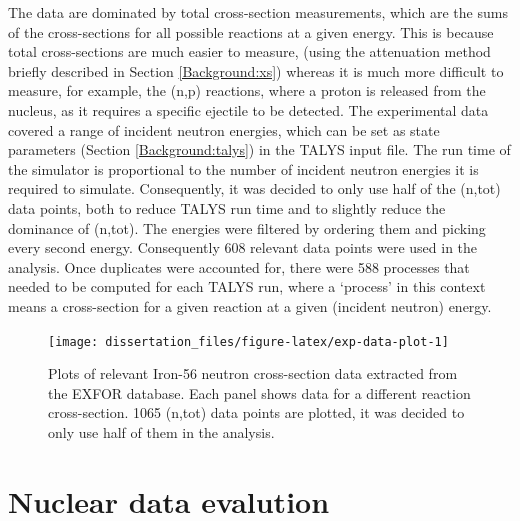 \documentclass[
  12pt,
  a4paper,
  twoside]{book}
\begin{document}
The data are dominated by total cross-section measurements, which are the sums of the cross-sections for all possible reactions at a given energy. This is because total cross-sections are much easier to measure, (using the attenuation method briefly described in Section \ref{Background:xs}) whereas it is much more difficult to measure, for example, the (n,p) reactions, where a proton is released from the nucleus, as it requires a specific ejectile to be detected. The experimental data covered a range of incident neutron energies, which can be set as state parameters (Section \ref{Background:talys}) in the TALYS input file. The run time of the simulator is proportional to the number of incident neutron energies it is required to simulate. Consequently, it was decided to only use half of the (n,tot) data points, both to reduce TALYS run time and to slightly reduce the dominance of (n,tot). The energies were filtered by ordering them and picking every second energy. Consequently 608 relevant data points were used in the analysis. Once duplicates were accounted for, there were 588 processes that needed to be computed for each TALYS run, where a `process' in this context means a cross-section for a given reaction at a given (incident neutron) energy.

\begin{figure}[H]

{\centering \texttt{[image: dissertation\_files/figure-latex/exp-data-plot-1]} 

}

\caption{Plots of relevant Iron-56 neutron cross-section data extracted from the EXFOR database. Each panel shows data for a different reaction cross-section. 1065 (n,tot) data points are plotted, it was decided to only use half of them in the analysis.}\label{fig:exp-data-plot}
\end{figure}

\hypertarget{Background:evaluation}{%
\section{Nuclear data evalution}\label{Background:evaluation}}
\end{document}
